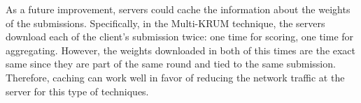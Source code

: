 As a future improvement, servers could cache the information about the weights of the submissions. Specifically, in the Multi-KRUM technique, the servers download each of the client's submission twice: one time for scoring, one time for aggregating. However, the weights downloaded in both of this times are the exact same since they are part of the same round and tied to the same submission. Therefore, caching can work well in favor of reducing the network traffic at the server for this type of techniques.
